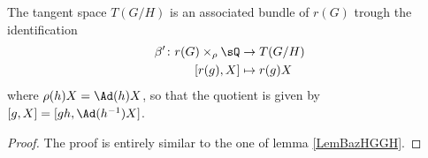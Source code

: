 \begin{lemma}
The tangent space $T(G/H)$ is an associated bundle of $r(G)$ trough the identification
\begin{equation}
\begin{aligned}
 \beta'\colon r(G)\times_{\rho}\sQ&\to T(G/H) \\ 
  [r(g),X]&\mapsto r(g)X 
\end{aligned}
\end{equation}
where $\rho(h)X=\Ad(h)X$, so that the quotient is given by $[g,X]=[gh,\Ad(h^{-1})X]$.
\end{lemma}

\begin{proof}
The proof is entirely similar to the one of lemma \ref{LemBazHGGH}.
\end{proof}
